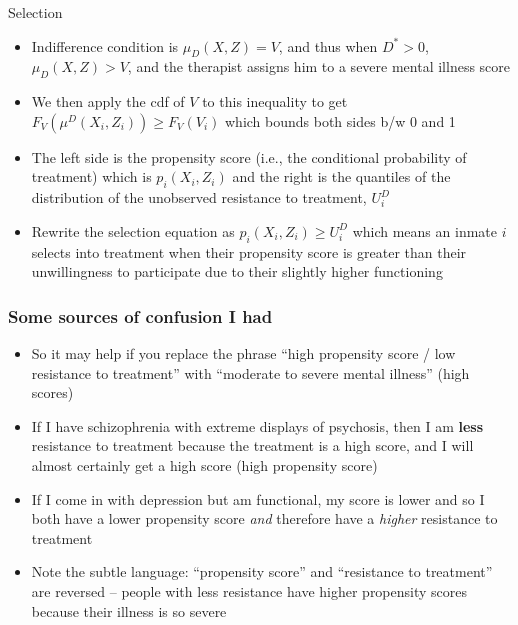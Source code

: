 \documentclass{beamer}
\begin{document}
\begin{frame}{Selection}

\begin{itemize}
\item Indifference condition is $\mu_D(X,Z)=V$, and thus when $D^*>0$, $\mu_D(X,Z)>V$, and the therapist assigns him to a severe mental illness score
\item We then apply the cdf of $V$ to this inequality to get $F_V(\mu^D(X_i,Z_i)) \geq F_V(V_i)$ which bounds both sides b/w 0 and 1
\item The left side is the propensity score (i.e., the conditional probability of treatment) which is $p_i(X_i,Z_i)$ and the right is the quantiles of the distribution of the unobserved resistance to treatment, $U_i^D$
\item Rewrite the selection equation  as $p_i(X_i,Z_i) \geq U_i^D$ which means an inmate $i$ selects into treatment when their propensity score is greater than their unwillingness to participate due to their slightly higher functioning
\end{itemize}

\end{frame}


\begin{frame}
\frametitle{Some sources of confusion I had}

\begin{itemize}
\item So it may help if you replace the phrase ``high propensity score / low resistance to treatment'' with ``moderate to severe mental illness'' (high scores)
\item If I have schizophrenia with extreme displays of psychosis, then I am \textbf{less} resistance to treatment because the treatment is a high score, and I will almost certainly get a high score (high propensity score)
\item If I come in with depression but am functional, my score is lower and so I both have a lower propensity score \emph{and} therefore have a \emph{higher} resistance to treatment
\item Note the subtle language: ``propensity score'' and ``resistance to treatment'' are reversed -- people with less resistance have higher propensity scores because their illness is so severe
\end{itemize}

\end{frame}
\end{document}
